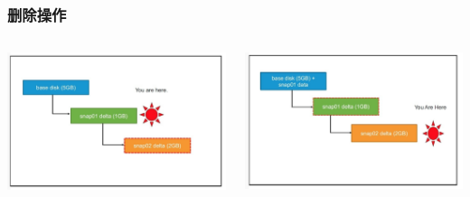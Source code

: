 \documentclass[UTF8,8pt,xcolor=dvipsnames]{beamer}
\begin{document}
\begin{frame}[fragile]
    \frametitle{删除操作}
    \begin{columns}
        \begin{column}{0.5\textwidth}
            \begin{center}
                \includegraphics[width=1.0\textwidth]{../imgs/snap-delete-leaf.png}
            \end{center}
        \end{column}

        \begin{column}{0.5\textwidth}
            \begin{center}
                \includegraphics[width=1.0\textwidth]{../imgs/snap-delete-non-leaf.png}
            \end{center}
        \end{column}
    \end{columns}
\end{frame}
\end{document}
